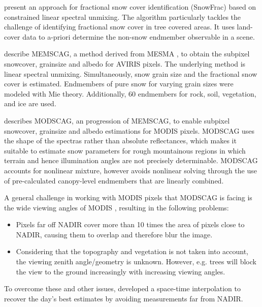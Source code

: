 \documentclass[letterpaper, parskip=half]{scrartcl}
\begin{document}
\cite{Vikhamar2003} present an approach for fractional snow cover identification (SnowFrac) based on constrained linear spectral unmixing. The algorithm particularly tackles the challenge of identifying fractional snow cover in tree covered areas. It uses land-cover data to a-priori determine the non-snow endmember observable in a scene.

\cite{Painter2003} describe \gls{MEMSCAG}, a method derived from \gls{MESMA} \citep{Roberts1998}, to obtain the subpixel snowcover, grainsize and albedo for \gls{AVIRIS} pixels. The underlying method is linear spectral unmixing. Simultaneously, snow grain size and the fractional snow cover is estimated. Endmembers of pure snow for varying grain sizes were modeled with Mie theory. Additionally, 60 endmembers for rock, soil, vegetation, and ice are used.

\Cite{Painter2009} describes \gls{MODSCAG}, an progression of \gls{MEMSCAG}, to enable subpixel snowcover, grainsize and albedo estimations for \gls{MODIS} pixels. \gls{MODSCAG} uses the shape of the spectras rather than absolute reflectances, which makes it suitable to estimate snow parameters for rough mountainous regions in which terrain and hence illumination angles are not precisely determinable. \gls{MODSCAG} accounts for nonlinear mixture, however avoids nonlinear solving through the use of pre-calculated canopy-level endmembers that are linearly combined.

A general challenge in working with \gls{MODIS} pixels that \gls{MODSCAG} is facing is the wide viewing angles of \gls{MODIS} \citep{Dozier2009, Dozier2008, Liu2008}, resulting in the following problems:
\begin{itemize}
 \item Pixels far off NADIR cover more than 10 times the area of pixels close to NADIR, causing them to overlap and therefore blur the image.
 \item Considering that the topography and vegetation is not taken into account, the viewing zenith angle/geometry is unknown. However, e.g. trees will block the view to the ground increasingly with increasing viewing angles.
\end{itemize}

To overcome these and other issues, \cite{Dozier2008} developed a space-time interpolation to recover the day's best estimates by avoiding measurements far from NADIR.

\end{document}
